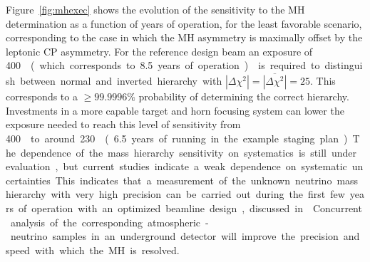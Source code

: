 Figure~\ref{fig:mhexec} shows the evolution of the sensitivity to the MH determination as a function
of years of operation, for the least favorable scenario, corresponding to the case in which the MH asymmetry is
maximally offset by the leptonic CP asymmetry. For the reference design beam an exposure of \SI{400}\ktMWyr{}  
(which corresponds to \num{8.5} years of operation) 
is required to distinguish
between normal and inverted hierarchy with $|\Delta \chi^2| =
\overline{|\Delta \chi^2|} = 25$.  This corresponds to a $\geq
99.9996\%$ probability of determining the correct hierarchy. 
Investments in a more capable target and horn focusing system can
lower the exposure needed to reach this level of sensitivity from
\SI{400}\ktMWyr{} to around \SI{230}\ktMWyr{} (\num{6.5} years of
running in the example staging plan). The dependence of the mass
hierarchy sensitivity on systematics is still under evaluation, but
current studies indicate a weak dependence on systematic
uncertainties. This indicates that a measurement of the unknown
neutrino mass hierarchy with very high precision can be carried out
during the first few years of operation with an optimized beamline
design, discussed in \vollbnf. Concurrent analysis of the corresponding atmospheric-neutrino
samples in an underground detector will improve the precision and
speed with which the MH is resolved.


